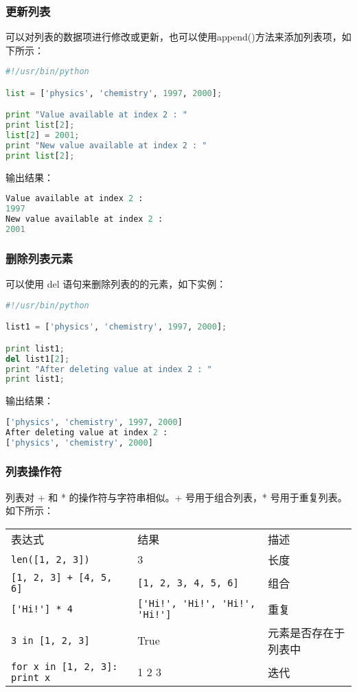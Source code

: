 \subsubsection{更新列表}
可以对列表的数据项进行修改或更新，也可以使用append()方法来添加列表项，如下所示：
\begin{lstlisting}[language=Python]
#!/usr/bin/python

list = ['physics', 'chemistry', 1997, 2000];

print "Value available at index 2 : "
print list[2];
list[2] = 2001;
print "New value available at index 2 : "
print list[2];
\end{lstlisting}
输出结果：
\begin{lstlisting}[language=Python]
Value available at index 2 :
1997
New value available at index 2 :
2001
\end{lstlisting}


\subsubsection{删除列表元素}
可以使用 del 语句来删除列表的的元素，如下实例：
\begin{lstlisting}[language=Python]
#!/usr/bin/python

list1 = ['physics', 'chemistry', 1997, 2000];

print list1;
del list1[2];
print "After deleting value at index 2 : "
print list1;
\end{lstlisting}
输出结果：
\begin{lstlisting}[language=Python]
['physics', 'chemistry', 1997, 2000]
After deleting value at index 2 :
['physics', 'chemistry', 2000]
\end{lstlisting}


\subsubsection{列表操作符}
列表对 + 和 * 的操作符与字符串相似。+ 号用于组合列表，* 号用于重复列表。
如下所示：

\begin{tabular}{l|l|l}
表达式&	结果&	描述\\
\verb|len([1, 2, 3])|&	3&	长度\\
\verb|[1, 2, 3] + [4, 5, 6]|&	\verb|[1, 2, 3, 4, 5, 6]|&	组合\\
\verb|['Hi!'] * 4| &	\verb|['Hi!', 'Hi!', 'Hi!', 'Hi!']| &	重复\\
\verb|3 in [1, 2, 3]| &	True&	元素是否存在于列表中\\
\verb|for x in [1, 2, 3]: print x| &	1 2 3&	迭代
\end{tabular}


